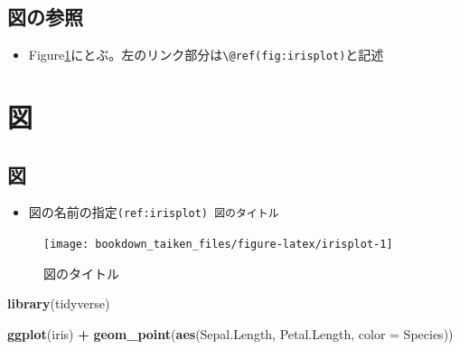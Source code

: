\documentclass[xelatex,ja=standard]{bxjsbook}
\newenvironment{Shaded}{\begin{snugshade}}{\end{snugshade}}
\newcommand{\DataTypeTok}[1]{\textcolor[rgb]{0.13,0.29,0.53}{#1}}
\newcommand{\KeywordTok}[1]{\textcolor[rgb]{0.13,0.29,0.53}{\textbf{#1}}}
\newcommand{\NormalTok}[1]{#1}
\newcommand{\OperatorTok}[1]{\textcolor[rgb]{0.81,0.36,0.00}{\textbf{#1}}}
\newcommand{\StringTok}[1]{\textcolor[rgb]{0.31,0.60,0.02}{#1}}
\providecommand{\tightlist}{%
  \setlength{\itemsep}{0pt}\setlength{\parskip}{0pt}}
\begin{document}
\hypertarget{intro_sansho}{%
\subsection{図の参照}\label{intro_sansho}}

\begin{itemize}
\tightlist
\item
  Figure\ref{fig:irisplot}にとぶ。左のリンク部分は\texttt{\textbackslash{}@ref(fig:irisplot)}と記述
\end{itemize}

\hypertarget{figure}{%
\section{図}\label{figure}}

\hypertarget{figure_fig}{%
\subsection{図}\label{figure_fig}}

\begin{itemize}
\tightlist
\item
  図の名前の指定\texttt{(ref:irisplot)\ 図のタイトル}
\end{itemize}



\begin{Shaded}
\end{Shaded}

\begin{figure}

{\centering \texttt{[image: bookdown\_taiken\_files/figure-latex/irisplot-1]} 

}

\caption{図のタイトル}\label{fig:irisplot}
\end{figure}



\begin{Shaded}
\begin{Highlighting}[]
\KeywordTok{library}\NormalTok{(tidyverse)}
\end{Highlighting}
\end{Shaded}

\begin{Shaded}
\begin{Highlighting}[]
\KeywordTok{ggplot}\NormalTok{(iris) }\OperatorTok{+}
\StringTok{  }\KeywordTok{geom_point}\NormalTok{(}\KeywordTok{aes}\NormalTok{(Sepal.Length, Petal.Length, }\DataTypeTok{color =}\NormalTok{ Species))}
\end{Highlighting}
\end{Shaded}
\end{document}
